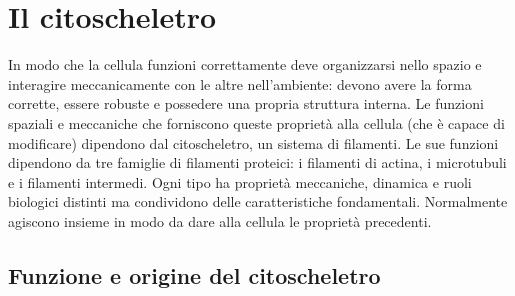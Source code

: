 \chapter{Il citoscheletro}
In modo che la cellula funzioni correttamente deve organizzarsi nello spazio e interagire meccanicamente con le altre nell'ambiente: devono avere la forma corrette, essere robuste e 
possedere una propria struttura interna. Le funzioni spaziali e meccaniche che forniscono queste propriet\`a alla cellula (che \`e capace di modificare) dipendono dal citoscheletro, un 
sistema di filamenti. Le sue funzioni dipendono da tre famiglie di filamenti proteici: i filamenti di actina, i microtubuli e i filamenti intermedi. Ogni tipo ha propriet\`a meccaniche, 
dinamica e ruoli biologici distinti ma condividono delle caratteristiche fondamentali. Normalmente agiscono insieme in modo da dare alla cellula le propriet\`a precedenti. 
\section{Funzione e origine del citoscheletro}
